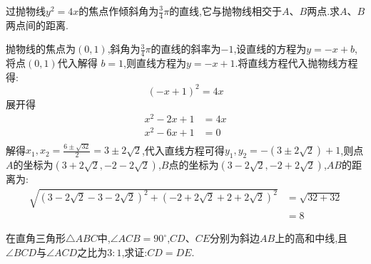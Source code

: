 \begin{questions}
	\question[8] 过抛物线$ y^2 = 4x
	$的焦点作倾斜角为$\frac34\pi$的直线,它与抛物线相交于$A$、$B$两点.求$A$、$B$两点间的距离.
	\begin{solution}
		抛物线的焦点为$(0,1)$,斜角为$\frac34\pi$的直线的斜率为$-1$,设直线的方程为$ y = -x + b $,将点$(0,1)$代入解得
		$b = 1$,则直线方程为$ y=-x+1 $.将直线方程代入抛物线方程得:
		\begin{equation*}
			(-x + 1)^2 = 4x
		\end{equation*}
		展开得
		\begin{align*}
			x^2 - 2x + 1 & = 4x \\
			x^2 -6x + 1  & = 0  \\
		\end{align*}
		解得$ x_1,x_2 = \frac{6 \pm \sqrt{32}}{2} = 3 \pm 2\sqrt{2} $,代入直线方程可得$ y_1,y_2 = -(3\pm2\sqrt{2}) +
			1$,则点$A$的坐标为$(3+2\sqrt{2}, -2 - 2\sqrt{2})$,$B$点的坐标为$(3-2\sqrt{2}, -2 + 2\sqrt{2})$,$AB$的距离为:
		\begin{align*}
			\sqrt{(3-2\sqrt{2} - 3 - 2\sqrt{2})^2 + (-2 + 2\sqrt{2} + 2 + 2\sqrt{2})^2}
			 & = \sqrt{32 + 32} \\
			 & = 8
		\end{align*}
	\end{solution}
	\question[8] 在直角三角形$ \triangle{ABC} $中,$ \angle{ACB} = 90^\circ
	$,$CD$、$CE$分别为斜边$AB$上的高和中线,且$\angle{BCD}$与$\angle{ACD}$之比为$3:1$,求证:$CD=DE$.


\end{questions}
